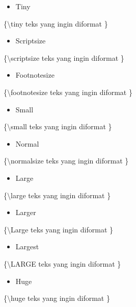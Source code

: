 \begin{itemize}
\item Tiny
\end{itemize}
\hspace{0,5in}\{$\setminus$tiny teks yang ingin diformat \}

\begin{itemize}
\item Scriptsize
\end{itemize}
\hspace{0,5in}\{$\setminus$scriptsize teks yang ingin diformat \}

\begin{itemize}
\item Footnotesize
\end{itemize}
\hspace{0,5in}\{$\setminus$footnotesize teks yang ingin diformat \}

\begin{itemize}
\item Small
\end{itemize}
\hspace{0,5in}\{$\setminus$small teks yang ingin diformat \}

\begin{itemize}
\item Normal
\end{itemize}
\hspace{0,5in}\{$\setminus$normalsize teks yang ingin diformat \}

\begin{itemize}
\item Large
\end{itemize}
\hspace{0,5in}\{$\setminus$large teks yang ingin diformat \}

\begin{itemize}
\item Larger
\end{itemize}
\hspace{0,5in}\{$\setminus$Large teks yang ingin diformat \}

\begin{itemize}
\item Largest
\end{itemize}
\hspace{0,5in}\{$\setminus$LARGE teks yang ingin diformat \}

\begin{itemize}
\item Huge
\end{itemize}
\hspace{0,5in}\{$\setminus$huge teks yang ingin diformat \}

